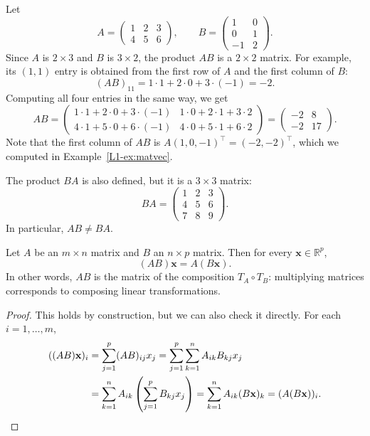 \begin{example}
    Let
    \[A = \begin{pmatrix}
        1 & 2 & 3 \\
        4 & 5 & 6
    \end{pmatrix}, \qquad B = \begin{pmatrix}
        1 & 0 \\
        0 & 1 \\
        -1 & 2
    \end{pmatrix}.\]
    Since $A$ is $2 \times 3$ and $B$ is $3 \times 2$, the product $AB$ is a $2 \times 2$ matrix. For example, its $(1, 1)$ entry is obtained from the first row of $A$ and the first column of $B$:
    \[(AB)_{11} = 1 \cdot 1 + 2 \cdot 0 + 3 \cdot (-1) = -2.\]
    Computing all four entries in the same way, we get
    \[AB = \begin{pmatrix}
        1 \cdot 1 + 2 \cdot 0 + 3 \cdot (-1) & 1 \cdot 0 + 2 \cdot 1 + 3 \cdot 2 \\
        4 \cdot 1 + 5 \cdot 0 + 6 \cdot (-1) & 4 \cdot 0 + 5 \cdot 1 + 6 \cdot 2
    \end{pmatrix} = \begin{pmatrix}
        -2 & 8 \\
        -2 & 17
    \end{pmatrix}.\]
    Note that the first column of $AB$ is $A(1, 0, -1)^\top = (-2, -2)^\top$, which we computed in Example~\ref{L1-ex:matvec}.

    The product $BA$ is also defined, but it is a $3 \times 3$ matrix:
    \[BA = \begin{pmatrix}
        1 & 2 & 3 \\
        4 & 5 & 6 \\
        7 & 8 & 9
    \end{pmatrix}.\]
    In particular, $AB \neq BA$.
\end{example}

\begin{theorem}\label{L1-thm:composition}
    Let $A$ be an $m \times n$ matrix and $B$ an $n \times p$ matrix. Then for every $\mathbf{x} \in \mathbb{R}^p$,
    \[(AB)\mathbf{x} = A(B\mathbf{x}).\]
    In other words, $AB$ is the matrix of the composition $T_A \circ T_B$: multiplying matrices corresponds to composing linear transformations.
\end{theorem}

\begin{proof}
    This holds by construction, but we can also check it directly. For each $i = 1, \ldots, m$,
    \begin{align*}
        ((AB)\mathbf{x})_i &= \sum_{j=1}^p (AB)_{ij} x_j = \sum_{j=1}^p \sum_{k=1}^n A_{ik} B_{kj} x_j \\
        &= \sum_{k=1}^n A_{ik} \left(\sum_{j=1}^p B_{kj} x_j\right) = \sum_{k=1}^n A_{ik} (B\mathbf{x})_k = (A(B\mathbf{x}))_i. \qedhere
    \end{align*}
\end{proof}

